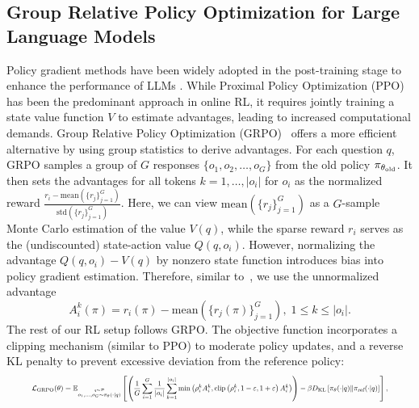 \subsection{Group Relative Policy Optimization for Large Language Models}
Policy gradient methods have been widely adopted in the post-training stage to enhance the performance of LLMs \citep{ouyang2022training, bai2022training, li2023remax, ahmadian2024back}.
While Proximal Policy Optimization (PPO)~\citep{schulman2017proximal} has been the predominant approach in online RL, it requires jointly training a state value function $V$ to estimate advantages, leading to increased computational demands. Group Relative Policy Optimization (GRPO)~\citep{shao2024deepseekmath} offers a more efficient alternative by using group statistics to derive advantages. 
For each question $q$, GRPO samples a group of $G$ responses $\{o_1, o_2, \ldots, o_G\}$ from the old 
 policy $\pi_{\theta_{\text{old}}}$. It then sets the advantages for all tokens $k = 1, \ldots, |o_i| $ for $o_i$ as the normalized reward
$
\frac{r_i - \text{mean}(\{r_j\}_{j=1}^G)}{\text{std}(\{r_j\}_{j=1}^G)}
$. Here, we can view $\text{mean}(\{r_j\}_{j=1}^G)$ as a $G$-sample Monte Carlo estimation of the value $V(q)$, while the sparse reward $r_i$ serves as the (undiscounted) state-action value $Q(q, o_i)$. However, 
normalizing the advantage $Q(q, o_i) - V(q)$ by nonzero state function introduces bias into policy gradient estimation. Therefore, similar to~\citet{liu2025understanding}, we use the unnormalized advantage
\begin{equation}
    A_i^k(\pi) = r_i(\pi) - \text{mean}(\{r_j(\pi)\}_{j=1}^G), \; 1 \leq k \leq |o_i|.
    \label{eq:our_adv}
\end{equation}
The rest of our RL setup follows GRPO. The objective function incorporates a clipping mechanism (similar to PPO) to moderate policy updates, and a reverse KL penalty to prevent excessive deviation from the reference policy:
\begin{equation}
\label{eq:grpo_loss}
\resizebox{0.93\columnwidth}{!}{
$
\displaystyle
\mathcal{L}_{\text{GRPO}}(\theta)
= \mathbb{E}_{\stackrel{q \sim \D}{o_1, \ldots, o_G \sim \pi_\theta(\cdot | q)}}
    \left[ \left( \frac{1}{G}\sum_{i=1}^G \frac{1}{|o_i|}\sum_{k=1}^{|o_i|} \min
    \left(\rho_i^k A_i^k, \text{clip}\left(\rho_i^k, 1-\varepsilon, 1 + \varepsilon \right) A_i^k\right) \right)
- \beta D_{\text{KL}}\left[\pi_\theta(\cdot | q)\| \pi_\text{ref}(\cdot | q) \right]
\right],
$
}
\end{equation}
